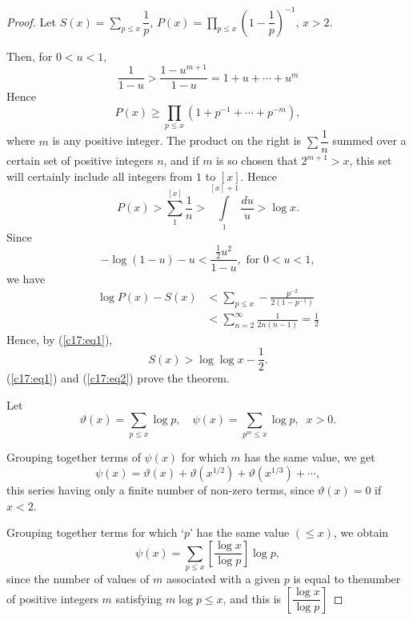 \begin{proof}
Let $S(x) = \sum\limits_{p\leq x} \dfrac{1}{p}$, \;\; $P(x) =
\prod\limits_{p\leq x} \left( 1-\dfrac{1}{p}\right)^{-1}$, \;\; $x>2$.

Then, for $0<u<1$,
$$
\frac{1}{1-u} > \frac{1-u^{m+1}}{1-u} = 1+ u + \cdots + u^m
$$
Hence
$$
P(x) \geq \prod\limits_{p \leq x} (1+p^{-1} + \cdots + p^{-m}),
$$
where $m$ is any positive integer. The product on the right is $\sum
\dfrac{1}{n}$ summed over a certain set of positive integers $n$, and
if $m$ is so chosen that $2^{m+1} > x$, this set will certainly
include all integers from $1$ to $[x]$. Hence
\begin{equation*}
P(x) > \sum\limits^{[x]}_1 \frac{1}{n} > \int\limits^{[x]+1}_1
\frac{du}{u} > \log x. \tag{1}\label{c17:eq1}
\end{equation*}
Since\pageoriginale
$$
-\log (1-u) - u < \frac{\frac{1}{2}u^2}{1-u}, \text{ for } 0 < u < 1,
$$
we have
\begin{align*}
\log P(x) - S(x) & < \sum\limits_{p\leq x} -
\frac{p^{-2}}{2(1-p^{-1})} \\
& < \sum\limits^\infty_{n=2} \frac{1}{2n(n-1)} =\frac{1}{2}
\end{align*}
Hence, by (\ref{c17:eq1}),
\begin{equation*}
S(x) > \log \log x -\frac{1}{2}. \tag{2}\label{c17:eq2}
\end{equation*}
(\ref{c17:eq1}) and (\ref{c17:eq2}) prove the theorem.

\medskip
{}
Let 
$$ 
\vartheta (x) = \sum\limits_{p\leq x} \log p, \quad \psi (x) =
\sum\limits_{p^m \leq x} \log p, \;\; x>0.
$$

Grouping together terms of $\psi(x)$ for which $m$ has the same value,
we get
\begin{equation*}
\psi (x) = \vartheta (x) + \vartheta (x^{1/2}) + \vartheta (x^{1/3}) +
\cdots, \tag{3}\label{c17:eq3}
\end{equation*}
this series having only a finite number of non-zero terms, since
$\vartheta (x) = 0$ if $x <2$.

Grouping together terms for which `$p$' has the same value $(\leq x)$,
we obtain
\begin{equation*}
\psi(x) = \sum\limits_{p\leq x } \left[\frac{\log x}{\log p} \right]
\log p,\tag{4} \label{c17:eq4}
\end{equation*}
since the number of values of $m$ associated with a given $p$ is equal
to the\pageoriginale number of positive integers $m$ satisfying $m\log
p \leq x$, and this is $\left[\dfrac{\log x}{\log p} \right]$ 
\end{proof}

